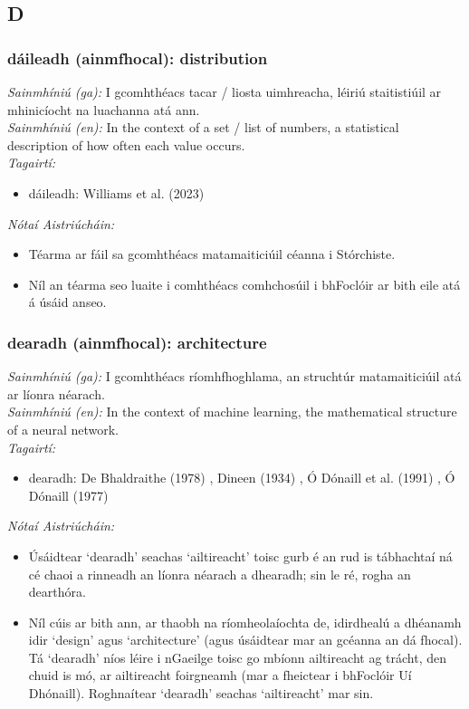 \documentclass{article}
\begin{document}
\subsection*{D}

\subsubsection*{dáileadh (ainmfhocal): distribution}
 \noindent \textit{Sainmhíniú (ga):} I gcomhthéacs tacar / liosta uimhreacha, léiriú staitistiúil ar mhinicíocht na luachanna atá ann.
\\
 \noindent \textit{Sainmhíniú (en):} In the context of a set / list of numbers, a statistical description of how often each value occurs.
\\
 \noindent \textit{Tagairtí:}
\begin{itemize}
	\item dáileadh: Williams et al. (2023) \cite{storchiste}
\end{itemize}

 \noindent \textit{Nótaí Aistriúcháin:}
\begin{itemize}
	\item Téarma ar fáil sa gcomhthéacs matamaiticiúil céanna i Stórchiste.
	\item Níl an téarma seo luaite i comhthéacs comhchosúil i bhFoclóir ar bith eile atá á úsáid anseo.
\end{itemize}


\subsubsection*{dearadh (ainmfhocal): architecture}
 \noindent \textit{Sainmhíniú (ga):} I gcomhthéacs ríomhfhoghlama, an struchtúr matamaiticiúil atá ar líonra néarach.
\\
 \noindent \textit{Sainmhíniú (en):} In the context of machine learning, the mathematical structure of a neural network.
\\
 \noindent \textit{Tagairtí:}
\begin{itemize}
	\item dearadh: De Bhaldraithe (1978) \cite{de-bhaldraithe}, Dineen (1934) \cite{dineen}, Ó Dónaill et al. (1991) \cite{focloir-beag}, Ó Dónaill (1977) \cite{odonaill}
\end{itemize}

 \noindent \textit{Nótaí Aistriúcháin:}
\begin{itemize}
	\item Úsáidtear `dearadh' seachas `ailtireacht' toisc gurb é an rud is tábhachtaí ná cé chaoi a rinneadh an líonra néarach a dhearadh; sin le ré, rogha an dearthóra.
	\item Níl cúis ar bith ann, ar thaobh na ríomheolaíochta de, idirdhealú a dhéanamh idir `design' agus `architecture' (agus úsáidtear mar an gcéanna an dá fhocal). Tá `dearadh' níos léire i nGaeilge toisc go mbíonn ailtireacht ag trácht, den chuid is mó, ar ailtireacht foirgneamh (mar a fheictear i bhFoclóir Uí Dhónaill). Roghnaítear `dearadh' seachas `ailtireacht' mar sin.
\end{itemize}
\end{document}
